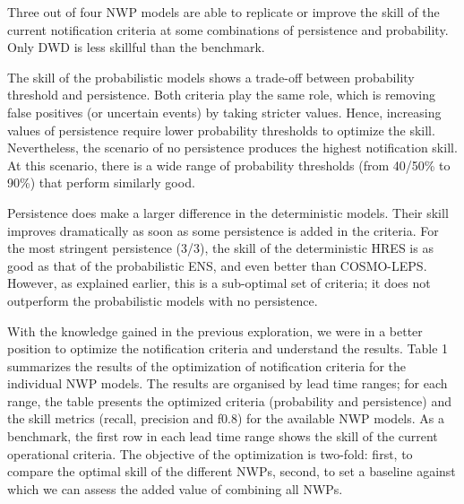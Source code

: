 \documentclass[preprint,12pt,authoryear]{elsarticle}
\begin{document}
Three out of four NWP models are able to replicate or improve the skill of the current notification criteria at some combinations of persistence and probability. Only DWD is less skillful than the benchmark.

The skill of the probabilistic models shows a trade-off between probability threshold and persistence. Both criteria play the same role, which is removing false positives (or uncertain events) by taking stricter values. Hence, increasing values of persistence require lower probability thresholds to optimize the skill. Nevertheless, the scenario of no persistence produces the highest notification skill. At this scenario, there is a wide range of probability thresholds (from 40/50\% to 90\%) that perform similarly good.

Persistence does make a larger difference in the deterministic models. Their skill improves dramatically as soon as some persistence is added in the criteria. For the most stringent persistence (3/3), the skill of the deterministic HRES is as good as that of the probabilistic ENS, and even better than COSMO-LEPS. However, as explained earlier, this is a sub-optimal set of criteria; it does not outperform the probabilistic models with no persistence.

With the knowledge gained in the previous exploration, we were in a better position to optimize the notification criteria and understand the results. Table 1 summarizes the results of the optimization of notification criteria for the individual NWP models. The results are organised by lead time ranges; for each range, the table presents the optimized criteria (probability and persistence) and the skill metrics (recall, precision and f0.8) for the available NWP models. As a benchmark, the first row in each lead time range shows the skill of the current operational criteria. The objective of the optimization is two-fold: first, to compare the optimal skill of the different NWPs, second, to set a baseline against which we can assess the added value of combining all NWPs.
\end{document}
